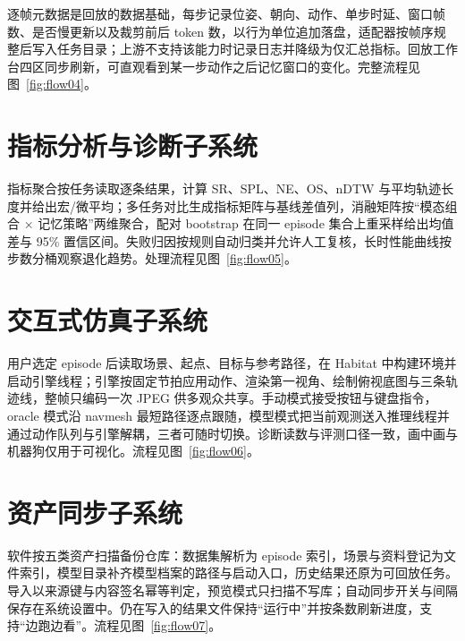 逐帧元数据是回放的数据基础，每步记录位姿、朝向、动作、单步时延、窗口帧数、是否慢更新以及裁剪前后 token 数，以行为单位追加落盘，适配器按帧序规整后写入任务目录；上游不支持该能力时记录日志并降级为仅汇总指标。回放工作台四区同步刷新，可直观看到某一步动作之后记忆窗口的变化。完整流程见图~\ref{fig:flow04}。


\section{指标分析与诊断子系统}

指标聚合按任务读取逐条结果，计算 SR、SPL、NE、OS、nDTW 与平均轨迹长度并给出宏/微平均；多任务对比生成指标矩阵与基线差值列，消融矩阵按“模态组合 × 记忆策略”两维聚合，配对 bootstrap 在同一 episode 集合上重采样给出均值差与 95\% 置信区间。失败归因按规则自动归类并允许人工复核，长时性能曲线按步数分桶观察退化趋势。处理流程见图~\ref{fig:flow05}。


\section{交互式仿真子系统}

用户选定 episode 后读取场景、起点、目标与参考路径，在 Habitat 中构建环境并启动引擎线程；引擎按固定节拍应用动作、渲染第一视角、绘制俯视底图与三条轨迹线，整帧只编码一次 JPEG 供多观众共享。手动模式接受按钮与键盘指令，oracle 模式沿 navmesh 最短路径逐点跟随，模型模式把当前观测送入推理线程并通过动作队列与引擎解耦，三者可随时切换。诊断读数与评测口径一致，画中画与机器狗仅用于可视化。流程见图~\ref{fig:flow06}。


\section{资产同步子系统}

软件按五类资产扫描备份仓库：数据集解析为 episode 索引，场景与资料登记为文件索引，模型目录补齐模型档案的路径与启动入口，历史结果还原为可回放任务。导入以来源键与内容签名幂等判定，预览模式只扫描不写库；自动同步开关与间隔保存在系统设置中。仍在写入的结果文件保持“运行中”并按条数刷新进度，支持“边跑边看”。流程见图~\ref{fig:flow07}。

